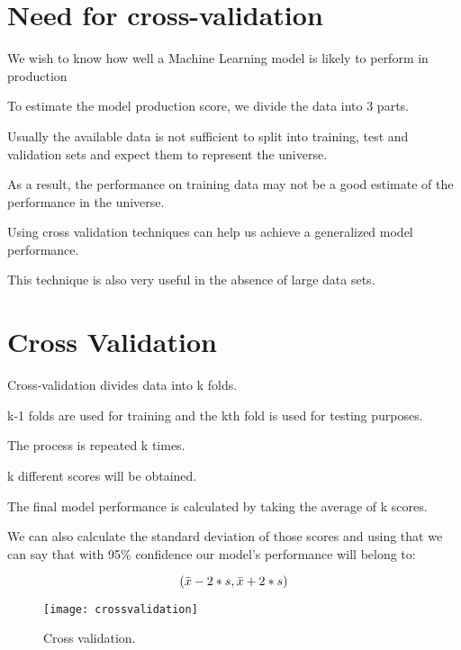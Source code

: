 	\section{Need for cross-validation}
	\begin{bulletedlist}
		\item We wish to know how well a Machine Learning model is likely to perform in production
		\item To estimate the model production score, we divide the data into 3 parts.
		\item Usually the available data is not sufficient to split into training, test and validation sets and expect them to represent the universe.
		\item As a result, the performance on training data may not be a good estimate of the performance in the universe.
		\item Using cross validation techniques can help us achieve a generalized model performance.
		\item This technique is also very useful in the absence of large data sets.
	\end{bulletedlist}

	\section{Cross Validation}
	\begin{bulletedlist}
		\item Cross-validation divides data into k folds.
		\item k-1 folds are used for training and the kth fold is used for testing purposes.
		\item The process is repeated k times.
		\item k different scores will be obtained.
		\item The final model performance is calculated by taking the average of k scores.
		\item We can also calculate the standard deviation of those scores and using that we can say that with 95\% confidence our model's performance will belong to:
	\end{bulletedlist}
	\begin{equation}
		\left(\mbox{$\bar{x}$} - 2*\mbox{$s$}{}, \mbox{$\bar{x}$} + 2*\mbox{$s$}{}\right)
	\end{equation}
	\begin{figure}[h]
		\centering
		\texttt{[image: crossvalidation]}
		\caption{Cross validation.}
		\label{fig:normaldistrution}
	\end{figure}


